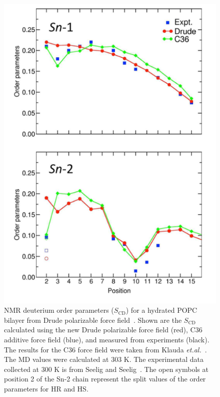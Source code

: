 \documentclass[journal=jpcbfk,manuscript=article,layout=twocolumn]{achemso}
\begin{document}
\begin{figure}[!htb]
	\centering
	\includegraphics[width=\columnwidth]{../Figures/popc_order_parameters_drude.png}
	\caption{NMR deuterium order parameters ($S_\mathrm{CD}$) for a hydrated
		POPC bilayer from Drude polarizable force field~\cite{li2017drude}. Shown are the $S_\mathrm{CD}$ calculated using the new Drude
		polarizable force field (red), C36 additive force field (blue), and
		measured from experiments (black). The results for the C36 force field were taken from Klauda \textit{et.al.}~\cite{klauda2010update}. The MD values were calculated at 303 K. The experimental data collected at 300 K is from Seelig and Seelig~\cite{seelig1975bilayers}. The open symbols at position 2 of the Sn-2 chain represent the split values of the order parameters for HR and HS.}
	\label{fig:drudepopc}
	\end{figure}
		
\end{document}
